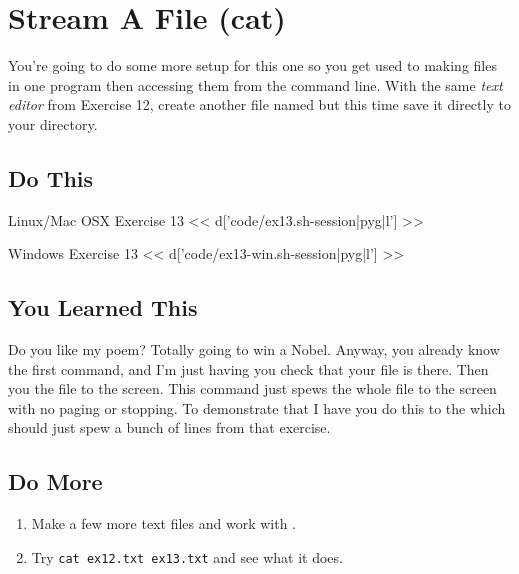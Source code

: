 \chapter{Stream A File (cat)}

You're going to do some more setup for this one so you get used to making files
in one program then accessing them from the command line.  With the same \emph{text editor} from
Exercise 12, create another file named  but this time save
it directly to your  directory.

\section{Do This}

\begin{code}{Linux/Mac OSX Exercise 13}
<< d['code/ex13.sh-session|pyg|l'] >>
\end{code}

\begin{code}{Windows Exercise 13}
<< d['code/ex13-win.sh-session|pyg|l'] >>
\end{code}

\section{You Learned This}

Do you like my poem? Totally going to win a Nobel.  Anyway, you already know the first command, and I'm just having you check that your file is there.  Then you  the file to the screen.  This command just spews the whole file to the 
screen with no paging or stopping.  To demonstrate that I have you do this to the
 which should just spew a bunch of lines from that exercise.

\section{Do More}

\begin{enumerate}
\item Make a few more text files and work with .
\item Try \verb|cat ex12.txt ex13.txt| and see what it does.
\end{enumerate}

